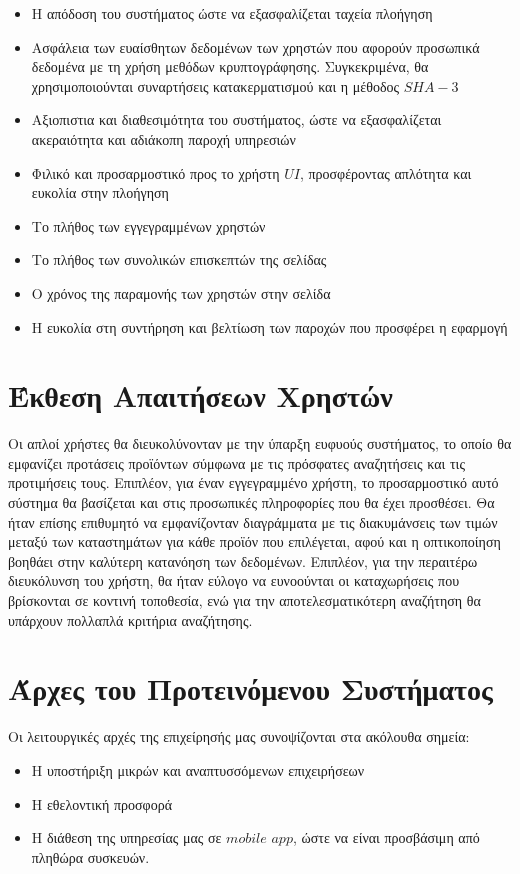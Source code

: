 \documentclass[12pt]{article}
\begin{document}
\begin{itemize}
		\item Η απόδοση του συστήματος	ώστε να εξασφαλίζεται ταχεία πλοήγηση
		\item Ασφάλεια των ευαίσθητων δεδομένων των χρηστών που αφορούν προσωπικά δεδομένα με τη χρήση μεθόδων κρυπτογράφησης. Συγκεκριμένα, θα χρησιμοποιούνται συναρτήσεις κατακερματισμού και η μέθοδος $SHA-3$
	\item Αξιοπιστια και διαθεσιμότητα του συστήματος, ώστε να εξασφαλίζεται ακεραιότητα και αδιάκοπη παροχή υπηρεσιών
	\item Φιλικό και προσαρμοστικό προς το χρήστη $UI$, προσφέροντας απλότητα και ευκολία στην πλοήγηση
	\item Το πλήθος των εγγεγραμμένων χρηστών
	\item Το πλήθος των συνολικών επισκεπτών της σελίδας
	\item Ο χρόνος της παραμονής των χρηστών στην σελίδα
	\item Η ευκολία στη συντήρηση και βελτίωση των παροχών που προσφέρει η εφαρμογή
	
\end{itemize}	 	


\section{Έκθεση Απαιτήσεων Χρηστών}

Οι απλοί χρήστες θα διευκολύνονταν με την ύπαρξη ευφυούς συστήματος, το οποίο θα εμφανίζει προτάσεις προϊόντων σύμφωνα με τις πρόσφατες αναζητήσεις και τις προτιμήσεις τους.  
Επιπλέον, για έναν εγγεγραμμένο χρήστη, το προσαρμοστικό αυτό σύστημα θα βασίζεται και στις προσωπικές πληροφορίες που θα έχει προσθέσει.
Θα ήταν επίσης επιθυμητό να εμφανίζονταν διαγράμματα με τις διακυμάνσεις των τιμών μεταξύ των καταστημάτων για κάθε προϊόν που επιλέγεται, αφού και η οπτικοποίηση βοηθάει στην καλύτερη κατανόηση των δεδομένων. Επιπλέον, για την περαιτέρω διευκόλυνση του χρήστη, θα ήταν εύλογο να ευνοούνται οι καταχωρήσεις που βρίσκονται σε κοντινή τοποθεσία, ενώ για την αποτελεσματικότερη αναζήτηση θα υπάρχουν πολλαπλά κριτήρια αναζήτησης.


\section{Άρχες του Προτεινόμενου Συστήματος}

Οι λειτουργικές αρχές της επιχείρησής μας συνοψίζονται στα ακόλουθα σημεία:
\begin{itemize}
	\item Η υποστήριξη μικρών και αναπτυσσόμενων επιχειρήσεων
	\item Η εθελοντική προσφορά
	\item Η διάθεση της υπηρεσίας μας σε $mobile$ $app$, ώστε να είναι προσβάσιμη από πληθώρα συσκευών.
	
\end{itemize}
\end{document}
